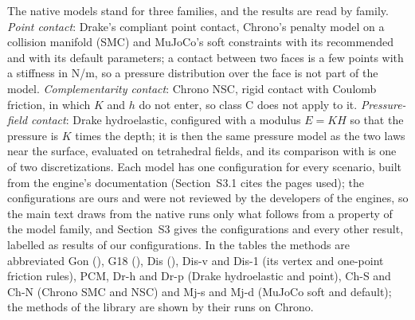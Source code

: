 The native models stand for three families, and the results are read by family. \emph{Point
contact}: Drake's compliant point contact, Chrono's penalty model on a collision manifold (SMC)
and MuJoCo's soft constraints with its recommended and with its default parameters; a contact
between two faces is a few points with a stiffness in N/m, so a pressure distribution over the
face is not part of the model. \emph{Complementarity contact}: Chrono NSC, rigid contact with
Coulomb friction, in which $K$ and $h$ do not enter, so class C does not apply to it.
\emph{Pressure-field contact}: Drake hydroelastic, configured with a modulus $E = K H$ so that
the pressure is $K$ times the depth; it is then the same pressure model as the two laws near
the surface, evaluated on tetrahedral fields, and its comparison with  is one
of two discretizations. Each model has one configuration for every scenario, built from the
engine's documentation (Section~S3.1 cites the pages used); the
configurations are ours and were not reviewed by the developers of the engines, so the main
text draws from the native runs only what follows from a property of the model family, and
Section~S3 gives the configurations and every other result, labelled as results of our
configurations. In the tables the methods are abbreviated Gon (), G18
(), Dis (), Dis-v and Dis-1 (its vertex and one-point
friction rules), PCM, Dr-h and Dr-p (Drake hydroelastic and point), Ch-S and Ch-N (Chrono SMC
and NSC) and Mj-s and Mj-d (MuJoCo soft and default); the methods of the library are shown by
their runs on Chrono.
